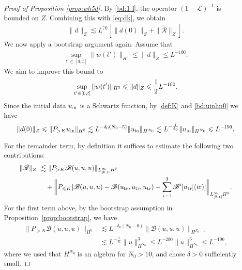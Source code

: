 \documentclass[UTF-8,reqno]{amsart}
\numberwithin{equation}{section}
\theoremstyle{definition}
\def\leq{\leqslant}
\def\leq{\leqslant}
\begin{document}
\begin{proof}[Proof of Proposition \ref{prop:wh5d}]
By \eqref{bd:1-l}, the operator $(1-\mathscr{L})^{-1}$ is bounded on $Z$. 
Combining this with \eqref{eq:dk}, we obtain 
\begin{align}
 \|d\|_{Z}\lesssim L^{70}[\|d(0)\|_{Z}+\|\tilde{\mathscr{R}}\|_{Z}].\label{bd:overlinec:boot}
\end{align}
We now apply a bootstrap argument again. Assume that
\begin{align}
 \sup_{t'\in[0,t]} \|w(t')\|_{H^{5}}\leq   \|d\|_{Z}\leq  L^{-100}.\label{bd:boot:wh5}
\end{align}
We aim to improve this bound to  \begin{align}
 \sup_{t'\in[0,t]} \|w(t')\|_{H^{5}}\leq   \|d\|_{Z}\leq  \frac12L^{-100}.\notag
\end{align}
Since the initial data $u_{\rm in}$ is a Schwartz function, by \eqref{def:K} and \eqref{bd:uinhn0} we have
\begin{align*}
    \|d(0)\|_{Z}\leq \|P_{>K}u_{\rm in}\|_{H^{5}}\lesssim L^{-\delta_0 (N_0-5)}\|u_{\rm in}\|_{H^{N_0}}\lesssim L^{-\frac{1}{\delta_0}} \|u_{\rm in}\|_{H^{N_0}}\leq  L^{-190}.
\end{align*}

For the remainder term, by definition it suffices to estimate the following two contributions:
\begin{align*}
    \|\tilde{\mathscr{R}}\|_Z\ &\lesssim \|P_{>K} \mathscr{B}(u,u,u)\|_{L^\infty_{[0,t]}H^{5}}\notag\\
    &\quad +\bigg\|P_{\leq K}[\mathscr{B}(u,u,u)-\mathscr{B}(u_{\rm tr},u_{\rm tr},u_{\rm tr})-\sum_{i=1}^3 \mathscr{B}^i[u_{\rm tr}](w)]\bigg\|_{L^\infty_{[0,t]}H^{5}}.
\end{align*}
For the first term above, by the bootstrap assumption in Proposition~\ref{prop:bootstrap}, we have
\begin{align*}
   \|P_{>K} \mathscr{B}(u,u,u)\|_{H^{5}}& \lesssim L^{-\delta_0(N_0-6)}\| \mathscr{B}(u,u,u)\|_{H^{N_0-1}}\\
   &\lesssim L^{-\frac1{\delta_0}}\|u\|_{H^{N_0}}^3\leq L^{-200} \|u\|_{H^{N_0}}^3\leq L^{-190},
\end{align*}
where we used that $H^{N_0}$ is an algebra for $N_0>10$, and chose $\delta>0$ sufficiently small.



\end{proof}
\end{document}
